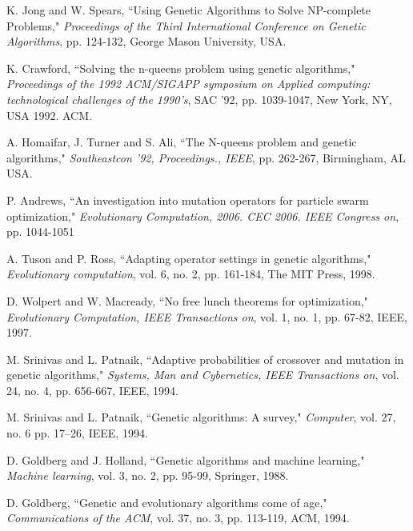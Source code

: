 \documentclass[conference]{IEEEtran}
\begin{document}
\def\V{\rm vol.~}
\def\N{no.~}
\def\pp{pp.~}
\def\Pot{\it Proc. }
\def\IJCNN{\it IEEE World Congress On Computational Intelligence\rm }
\def\ACC{\it Beijing International Convention Center\rm }
\def\SMC{\it IEEE Trans. Systems\rm , \it Man\rm , and \it Cybernetics\rm } 
\newpage
\begin{thebibliography}{24}

 K. Jong and W. Spears, ``Using Genetic Algorithms to Solve NP-complete Problems,"
        {\it Proceedings of the Third International Conference on Genetic Algorithms}, pp. 124-132, George Mason University, USA.

 K. Crawford, ``Solving the n-queens problem using genetic algorithms,"
        {\it Proceedings of the 1992 ACM/SIGAPP symposium on Applied computing: technological challenges of the 1990's}, SAC '92, pp. 1039-1047, New York, NY, USA 1992. ACM.

 A. Homaifar, J. Turner and S. Ali, ``The N-queens problem and genetic algorithms," 
        {\it Southeastcon '92, Proceedings., IEEE}, pp. 262-267, Birmingham, AL USA.

 P. Andrews, ``An investigation into mutation operators for particle swarm optimization,"
        {\it Evolutionary Computation, 2006. CEC 2006. IEEE Congress on}, pp. 1044-1051

 A. Tuson and P. Ross, ``Adapting operator settings in genetic algorithms,"
        {\it Evolutionary computation}, vol. 6, no. 2, pp. 161-184, The MIT Press, 1998.

 D. Wolpert and W. Macready, ``No free lunch theorems for optimization,"
        {\it Evolutionary Computation, IEEE Transactions on}, vol. 1, no. 1, pp. 67-82, IEEE, 1997.

 M. Srinivas and L. Patnaik, ``Adaptive probabilities of crossover and mutation in genetic algorithms,"
        {\it Systems, Man and Cybernetics, IEEE Transactions on}, vol. 24, no. 4, pp. 656-667, IEEE, 1994.

 M. Srinivas and L. Patnaik, ``Genetic algorithms: A survey,"
        {\it Computer}, vol. 27, no. 6 pp. 17--26, IEEE, 1994.

 D. Goldberg and J. Holland, ``Genetic algorithms and machine learning,"
        {\it Machine learning}, vol. 3, no. 2, pp. 95-99, Springer, 1988.

 D. Goldberg, ``Genetic and evolutionary algorithms come of age,"
        {\it Communications of the ACM}, vol. 37, no. 3, pp. 113-119, ACM, 1994.


\end{thebibliography}
\end{document}
